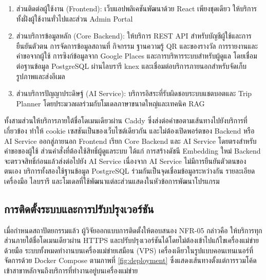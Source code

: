 \begin{enumerate}[label=(\arabic*),leftmargin=0pt,itemindent=\dimexpr\parindent+\parenlabelwidth+1em\relax,align=right,labelwidth=\parenlabelwidth,labelsep=1em]
\item ส่วนติดต่อผู้ใช้งาน (Frontend): เว็บแอปพลิเคชันพัฒนาด้วย React เพียงชุดเดียว ให้บริการทั้งฝั่งผู้ใช้งานทั่วไปและส่วน Admin Portal
\item ส่วนบริการข้อมูลหลัก (Core Backend): ให้บริการ REST API สำหรับบัญชีผู้ใช้และการยืนยันตัวตน การจัดการข้อมูลสถานที่ กิจกรรม ฐานความรู้ QR และของรางวัล การรายงานและคำขอจากผู้ใช้ การซิงก์ข้อมูลจาก Google Places และการบริหารระบบสำหรับผู้ดูแล โดยเชื่อมต่อฐานข้อมูล PostgreSQL ผ่านไลบรารี knex และเชื่อมต่อบริการภายนอกสำหรับจัดเก็บรูปภาพและส่งอีเมล
\item ส่วนบริการปัญญาประดิษฐ์ (AI Service): บริการอิสระที่รับผิดชอบระบบแชตบอตและ Trip Planner โดยประมวลผลร่วมกับโมเดลภาษาขนาดใหญ่และเทคนิค RAG
\end{enumerate}

ทั้งสามส่วนให้บริการภายใต้ชื่อโดเมนเดียวผ่าน Caddy ซึ่งส่งต่อคำขอตามเส้นทางไปยังบริการที่เกี่ยวข้อง ทำให้ cookie เซสชันเป็นของเว็บไซต์เดียวกัน และไม่ต้องเปิดพอร์ตของ Backend หรือ AI Service ออกสู่ภายนอก Frontend เรียก Core Backend และ AI Service โดยตรงสำหรับคำขอของผู้ใช้ ส่วนคำสั่งที่ต้องใช้สิทธิ์ผู้ดูแลระบบ ได้แก่ การสร้างดัชนี Embedding ใหม่ Backend จะตรวจสิทธิ์ก่อนแล้วส่งต่อไปยัง AI Service เนื่องจาก AI Service ไม่มีการยืนยันตัวตนของตนเอง บริการทั้งสองใช้ฐานข้อมูล PostgreSQL ร่วมกันเป็นจุดเชื่อมข้อมูลระหว่างกัน รายละเอียดเครื่องมือ ไลบรารี และโมเดลที่ใช้พัฒนาแต่ละส่วนแสดงในหัวข้อการพัฒนาโปรแกรม

\subsection{การติดตั้งระบบและการปรับปรุงเวอร์ชัน}

เมื่อกำหนดสถาปัตยกรรมแล้ว ผู้วิจัยออกแบบการติดตั้งให้ตอบสนอง NFR-05 กล่าวคือ ให้บริการทุกส่วนภายใต้ชื่อโดเมนเดียวผ่าน HTTPS และปรับปรุงเวอร์ชันได้โดยไม่ต้องเข้าไปแก้ไขเครื่องแม่ข่ายด้วยมือ ระบบทั้งหมดทำงานบนเครื่องแม่ข่ายเสมือน (VPS) เครื่องเดียวในรูปแบบคอนเทนเนอร์ที่จัดการด้วย Docker Compose ตามภาพที่ \ref{fig:deployment} ซึ่งแสดงเส้นทางตั้งแต่การรวมโค้ดเข้าสาขาหลักจนถึงบริการที่ทำงานอยู่บนเครื่องแม่ข่าย

